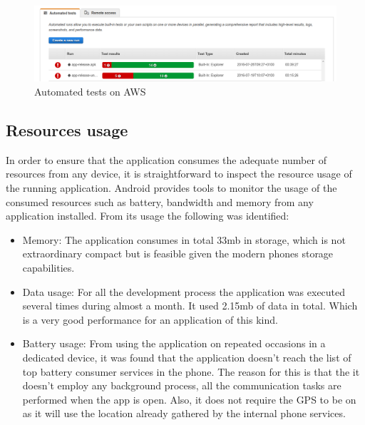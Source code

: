 \begin{figure}[H]
\begin{adjustbox}{width=1\textwidth,center=\textwidth}
  \centering
  \includegraphics[scale=1]{images/automated_tests.png}
\end{adjustbox}
  \caption[Automated tests on AWS]{Automated tests on AWS}
  \label{fig:automated_tests}
\end{figure}

\subsection{Resources usage}
In order to ensure that the application consumes the adequate number of resources from any device, it is straightforward to inspect the resource usage of the running application. Android provides tools to monitor the usage of the consumed resources such as battery, bandwidth and memory from any application installed. From its usage the following was identified:
\begin{itemize}
	\item Memory: The application consumes in total 33mb in storage, which is not extraordinary compact but is feasible given the modern phones storage capabilities. 
    \item Data usage: For all the development process the application was executed several times during almost a month. It used 2.15mb of data in total. Which is a very good performance for an application of this kind.
    \item Battery usage: From using the application on repeated occasions in a dedicated device, it was found that the application doesn't reach the list of top battery consumer services in the phone. The reason for this is that the it doesn't employ any background process, all the communication tasks are performed when the app is open. Also, it does not require the GPS to be on as it will use the location already gathered by the internal phone services.
\end{itemize}


